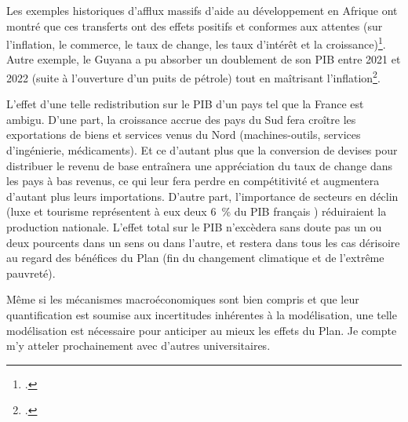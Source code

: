 \documentclass[a5paper,french,openany]{memoir}
\begin{document}
Les exemples historiques d'afflux massifs d'aide au développement en Afrique ont montré que ces transferts ont des effets positifs et conformes aux attentes (sur l'inflation, le commerce, le taux de change, les taux d'intérêt et la croissance)\footnote{\cite{strand_revenue_2009,berg_macroeconomics_2007}.}. Autre exemple, le Guyana a pu absorber un doublement de son PIB entre 2021 et 2022 (suite à l'ouverture d'un puits de pétrole) tout en maîtrisant l'inflation\footnote{\citet{fmi_guyana_2023}.}. 

L'effet d'une telle redistribution sur le PIB d'un pays tel que la France est ambigu. D'une part, la croissance accrue des pays du Sud fera croître les exportations de biens et services venus du Nord (machines-outils, services d'ingénierie, médicaments). Et ce d'autant plus que la conversion de devises pour distribuer le revenu de base entraînera une appréciation du taux de change dans les pays à bas revenus, ce qui leur fera perdre en compétitivité et augmentera d'autant plus leurs importations. D'autre part, l'importance de secteurs en déclin (luxe et tourisme représentent à eux deux 6~\% du PIB français%
) réduiraient la production nationale. L'effet total sur le PIB n'excèdera sans doute pas un ou deux pourcents dans un sens ou dans l'autre, et restera dans tous les cas dérisoire au regard des bénéfices du Plan (fin du changement climatique et de l'extrême pauvreté). 

Même si les mécanismes macroéconomiques sont bien compris et que leur quantification est soumise aux incertitudes inhérentes à la modélisation, une telle modélisation est nécessaire pour anticiper au mieux les effets du Plan. Je compte m'y atteler prochainement avec d'autres universitaires.

\end{document}
